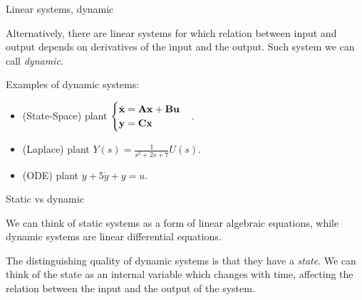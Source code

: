 \documentclass{beamer}
\begin{document}
\begin{frame}{Linear systems, dynamic}
	\begin{flushleft}
		
		Alternatively, there are linear systems for which relation between input and output depends on derivatives of the input and the output. Such system we can call \emph{dynamic}.
		
		\bigskip
		
		Examples of dynamic systems:
		
		\begin{itemize}
			\item (State-Space) plant $\begin{cases}
				\dot {\mathbf{x}} = \mathbf{A} \mathbf{x} + \mathbf{B} \mathbf{u} \\
				\mathbf{y} = \mathbf{C} \mathbf{x}
			\end{cases}$.
			
			\item (Laplace) plant $Y(s) = \frac{1}{s^2 + 2s + 7} U(s)$.
			
			\item (ODE) plant $\ddot y + 5 \dot y + y = u$.
		\end{itemize}
		
	\end{flushleft}
\end{frame}



\begin{frame}{Static vs dynamic}
	\begin{flushleft}
		
		We can think of static systems as a form of linear algebraic equations, while dynamic systems are linear differential equations.
		
		\bigskip
		
		The distinguishing quality of dynamic systems is that they have a \emph{state}. We can think of the state as an internal variable which changes with time, affecting the relation between the input and the output of the system.
		
	\end{flushleft}
\end{frame}
\end{document}
